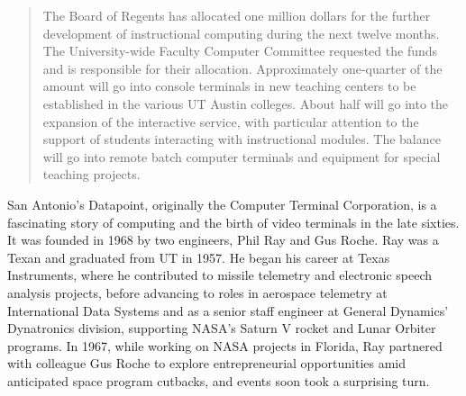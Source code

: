 \begin{quotation}
The Board of Regents has allocated one million dollars for the further development of instructional computing during the next twelve months. The University-wide Faculty Computer Committee requested the funds and is responsible for their allocation. Approximately one-quarter of the amount will go into console terminals in new teaching centers to be established in the various UT Austin colleges. About half will go into the expansion of the interactive service, with particular attention to the support of students interacting with instructional modules. The balance will go into remote batch computer terminals and equipment for special teaching projects. \cite{warlickComputersInstruction1973}
\end{quotation}

San Antonio’s Datapoint, originally the Computer Terminal Corporation, is a fascinating story of computing and the birth of video terminals in the late sixties. It was founded in 1968 by two engineers, Phil Ray and Gus Roche. Ray was a Texan and graduated from UT in 1957. He began his career at Texas Instruments, where he contributed to missile telemetry and electronic speech analysis projects, before advancing to roles in aerospace telemetry at International Data Systems and as a senior staff engineer at General Dynamics' Dynatronics division, supporting NASA's Saturn V rocket and Lunar Orbiter programs. In 1967, while working on NASA projects in Florida, Ray partnered with colleague Gus Roche to explore entrepreneurial opportunities amid anticipated space program cutbacks, and events soon took a surprising turn.

